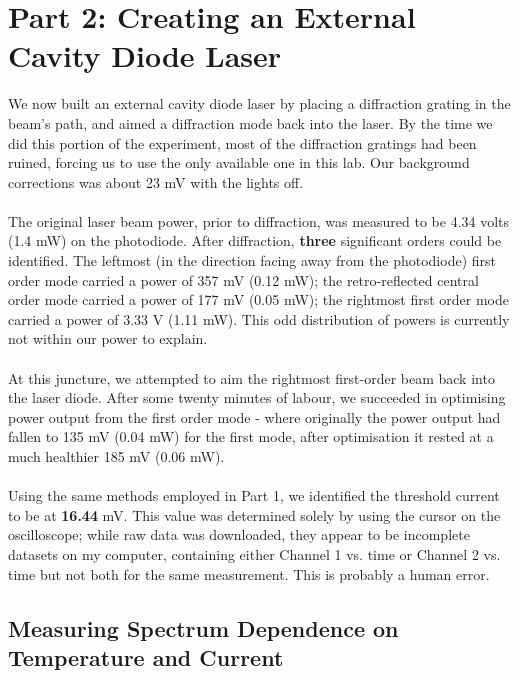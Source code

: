 \documentclass[10pt,a4paper]{article}
\begin{document}
\section*{Part 2: Creating an External Cavity Diode Laser}
We now built an external cavity diode laser by placing a diffraction grating in the beam's path, and aimed a diffraction mode back into the laser. By the time we did this portion of the experiment, most of the diffraction gratings had been ruined, forcing us to use the only available one in this lab. Our background corrections was about 23 mV with the lights off.\\
\\
The original laser beam power, prior to diffraction, was measured to be 4.34 volts (1.4 mW) on the photodiode. After diffraction, \textbf{three} significant orders could be identified. The leftmost (in the direction facing away from the photodiode) first order mode carried a power of 357 mV (0.12 mW); the retro-reflected central order mode carried a power of 177 mV (0.05 mW); the rightmost first order mode carried a power of 3.33 V (1.11 mW). This odd distribution of powers is currently not within our power to explain.\\
\\
At this juncture, we attempted to aim the rightmost first-order beam back into the laser diode. After some twenty minutes of labour, we succeeded in optimising power output from the first order mode - where originally the power output had fallen to 135 mV (0.04 mW) for the first mode, after optimisation it rested at a much healthier 185 mV (0.06 mW).\\
\\
Using the same methods employed in Part 1, we identified the threshold current to be at \textbf{16.44} mV. This value was determined solely by using the cursor on the oscilloscope; while raw data was downloaded, they appear to be incomplete datasets on my computer, containing either Channel 1 vs. time or Channel 2 vs. time but not both for the same measurement. This is probably a human error.

\subsection*{Measuring Spectrum Dependence on Temperature and Current}
\end{document}

